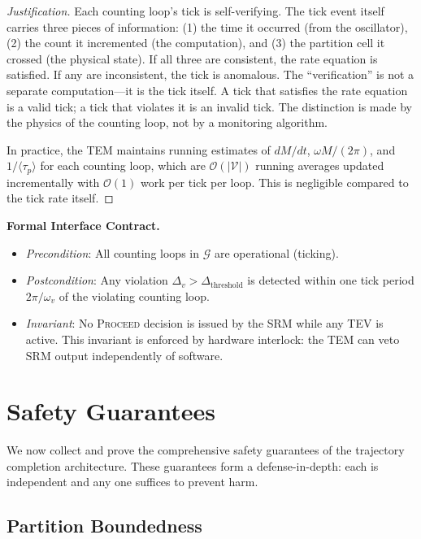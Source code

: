 \documentclass[twocolumn,10pt]{article}
\theoremstyle{definition}
\newcommand{\taup}{\tau_p}
\newcommand{\BigO}{\mathcal{O}}
\begin{document}
\begin{proof}[Justification]
Each counting loop's tick is self-verifying. The tick event itself carries three pieces of information: (1) the time it occurred (from the oscillator), (2) the count it incremented (the computation), and (3) the partition cell it crossed (the physical state). If all three are consistent, the rate equation is satisfied. If any are inconsistent, the tick is anomalous. The ``verification'' is not a separate computation---it is the tick itself. A tick that satisfies the rate equation is a valid tick; a tick that violates it is an invalid tick. The distinction is made by the physics of the counting loop, not by a monitoring algorithm.

In practice, the TEM maintains running estimates of $dM/dt$, $\omega M/(2\pi)$, and $1/\langle \taup \rangle$ for each counting loop, which are $\BigO(|\mathcal{V}|)$ running averages updated incrementally with $\BigO(1)$ work per tick per loop. This is negligible compared to the tick rate itself.
\end{proof}

\textbf{Formal Interface Contract.}
\begin{itemize}[leftmargin=*]
\item \emph{Precondition}: All counting loops in $\mathcal{G}$ are operational (ticking).
\item \emph{Postcondition}: Any violation $\Delta_v > \Delta_{\mathrm{threshold}}$ is detected within one tick period $2\pi/\omega_v$ of the violating counting loop.
\item \emph{Invariant}: No \textsc{Proceed} decision is issued by the SRM while any TEV is active. This invariant is enforced by hardware interlock: the TEM can veto SRM output independently of software.
\end{itemize}


\section{Safety Guarantees}
\label{sec:safety}

We now collect and prove the comprehensive safety guarantees of the trajectory completion architecture. These guarantees form a defense-in-depth: each is independent and any one suffices to prevent harm.

\subsection{Partition Boundedness}
\end{document}
